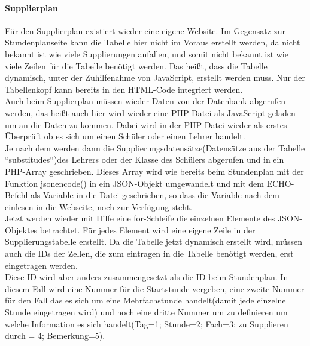 \paragraph{Supplierplan\\}
Für den Supplierplan existiert wieder eine eigene Website. Im Gegensatz zur Stundenplanseite kann die Tabelle hier nicht im Voraus erstellt werden, da nicht bekannt ist wie viele Supplierungen anfallen, und somit nicht bekannt ist wie viele Zeilen für die Tabelle benötigt werden. Das heißt, dass die Tabelle dynamisch, unter der Zuhilfenahme von JavaScript, erstellt werden muss. Nur der Tabellenkopf kann bereits in den HTML-Code integriert werden.\\
Auch beim Supplierplan müssen wieder Daten von der Datenbank abgerufen werden, das heißt auch hier wird wieder eine PHP-Datei als JavaScript geladen um an die Daten zu kommen. Dabei wird in der PHP-Datei wieder als erstes Überprüft ob es sich um einen Schüler oder einen Lehrer handelt.\\
Je nach dem werden dann die Supplierungsdatensätze(Datensätze aus der Tabelle “substitudes“)des Lehrers oder der Klasse des Schülers abgerufen und in ein PHP-Array geschrieben. Dieses Array wird wie bereits beim Stundenplan mit der Funktion jsonencode() in ein JSON-Objekt umgewandelt und mit dem ECHO-Befehl als Variable in die Datei geschrieben, so dass die Variable nach dem einlesen in die Webseite, noch zur Verfügung steht.\\
Jetzt werden wieder mit Hilfe eine for-Schleife die einzelnen Elemente des JSON-Objektes betrachtet. Für jedes Element wird eine eigene Zeile in der Supplierungstabelle erstellt. Da die Tabelle jetzt dynamisch erstellt wird, müssen auch die IDs der Zellen, die zum eintragen in die Tabelle benötigt werden, erst eingetragen werden.\\
Diese ID wird aber anders zusammengesetzt als die ID beim Stundenplan. In diesem Fall wird eine Nummer für die Startstunde vergeben, eine zweite Nummer für den Fall das es sich um eine Mehrfachstunde handelt(damit jede einzelne Stunde eingetragen wird) und noch eine dritte Nummer um zu definieren um welche Information es sich handelt(Tag=1; Stunde=2; Fach=3; zu Supplieren durch = 4; Bemerkung=5).\\

